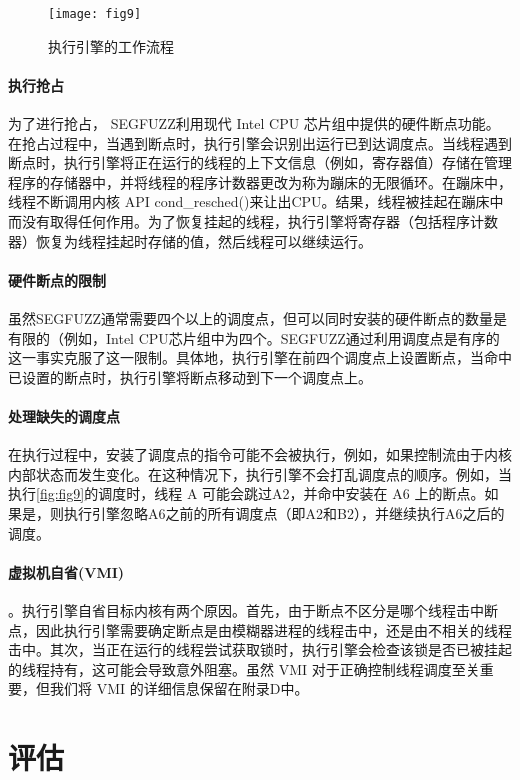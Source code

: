 \begin{figure}[ht]
    \centering
    \texttt{[image: fig9]}
    \caption{\label{fig:fig9}执行引擎的工作流程}
\end{figure}

\paragraph{执行抢占}为了进行抢占， SEGFUZZ利用现代 Intel CPU 芯片组中提供的硬件断点功能。在抢占过程中，当遇到断点时，执行引擎会识别出运行已到达调度点。当线程遇到断点时，执行引擎将正在运行的线程的上下文信息（例如，寄存器值）存储在管理程序的存储器中，并将线程的程序计数器更改为称为蹦床的无限循环。在蹦床中，线程不断调用内核 API cond\_resched()来让出CPU。结果，线程被挂起在蹦床中而没有取得任何作用。为了恢复挂起的线程，执行引擎将寄存器（包括程序计数器）恢复为线程挂起时存储的值，然后线程可以继续运行。

\paragraph{硬件断点的限制}虽然SEGFUZZ通常需要四个以上的调度点，但可以同时安装的硬件断点的数量是有限的（例如，Intel CPU芯片组中为四个。SEGFUZZ通过利用调度点是有序的这一事实克服了这一限制。具体地，执行引擎在前四个调度点上设置断点，当命中已设置的断点时，执行引擎将断点移动到下一个调度点上。

\paragraph{处理缺失的调度点}在执行过程中，安装了调度点的指令可能不会被执行，例如，如果控制流由于内核内部状态而发生变化。在这种情况下，执行引擎不会打乱调度点的顺序。例如，当执行\autoref{fig:fig9}的调度时，线程 A 可能会跳过A2，并命中安装在 A6 上的断点。如果是，则执行引擎忽略A6之前的所有调度点（即A2和B2），并继续执行A6之后的调度。


\paragraph{虚拟机自省(VMI)}。执行引擎自省目标内核有两个原因。首先，由于断点不区分是哪个线程击中断点，因此执行引擎需要确定断点是由模糊器进程的线程击中，还是由不相关的线程击中。其次，当正在运行的线程尝试获取锁时，执行引擎会检查该锁是否已被挂起的线程持有，这可能会导致意外阻塞。虽然 VMI 对于正确控制线程调度至关重要，但我们将 VMI 的详细信息保留在附录D中。

\section{评估}

